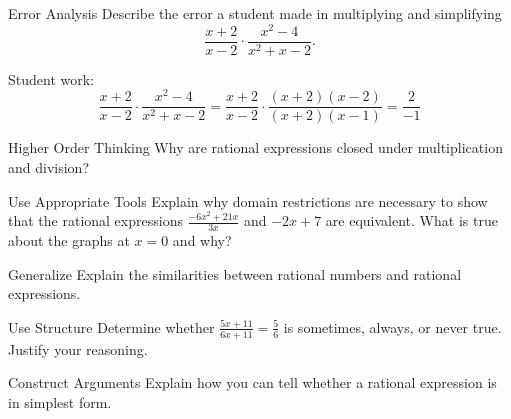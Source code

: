 \documentclass{article}
\newenvironment{practice}[2]{}{}        %
\newcommand{\answer}[1]{}               %
\begin{document}
\begin{practice}{12}{2}
Error Analysis Describe the error a student made in multiplying and simplifying
\[
\frac{x+2}{x-2}\cdot\frac{x^2-4}{x^2+x-2}.
\]

Student work:
\[
\frac{x+2}{x-2}\cdot\frac{x^2-4}{x^2+x-2}
=
\frac{x+2}{x-2}\cdot\frac{(x+2)(x-2)}{(x+2)(x-1)}
=
\frac{2}{-1}
\]
\answer{The student cannot cancel the \(x\)'s in \(x+2\) and \(x-1\) because only common factors, not terms, can be canceled.}
\end{practice}

\begin{practice}{13}{3}
Higher Order Thinking Why are rational expressions closed under multiplication and division?
\answer{Sample: \(\frac{a}{b}\cdot\frac{c}{d}=\frac{ac}{bd}\), and \(\frac{a}{b}\div\frac{c}{d}=\frac{a}{b}\cdot\frac{d}{c}=\frac{ad}{bc}\).}
\end{practice}

\begin{practice}{14}{2}
Use Appropriate Tools Explain why domain restrictions are necessary to show that the rational expressions \(\frac{-6x^2+21x}{3x}\) and \(-2x+7\) are equivalent. What is true about the graphs at \(x=0\) and why?
\answer{Sample answer: Domain restrictions are needed because you may not be able to tell just from graphs when two expressions are not equivalent. The graphs of \(y=\frac{-6x^2+21x}{3x}\) and \(y=-2x+7\) may look identical, but using the trace feature or a table values, \(y=\frac{-6x^2+21x}{3x}\) is undefined at \(x=0\), while \(y=-2x+7\) is equal to 7 at \(x=0\).}
\end{practice}

\begin{practice}{15}{2}
Generalize Explain the similarities between rational numbers and rational expressions.
\answer{A rational number is the ratio of two integers, while a rational expression is a ratio of two polynomials.}
\end{practice}

\begin{practice}{16}{2}
Use Structure Determine whether \(\frac{5x+11}{6x+11}=\frac{5}{6}\) is sometimes, always, or never true. Justify your reasoning.
\answer{Never; when you cross multiply, you get \(30x+66=30x+55\); since \(66\ne55\), there is no real number \(x\) for which that equation is true.}
\end{practice}

\begin{practice}{17}{2}
Construct Arguments Explain how you can tell whether a rational expression is in simplest form.
\answer{A rational expression is in simplest form when the numerator and denominator have no common factors other than 1.}
\end{practice}
\end{document}
